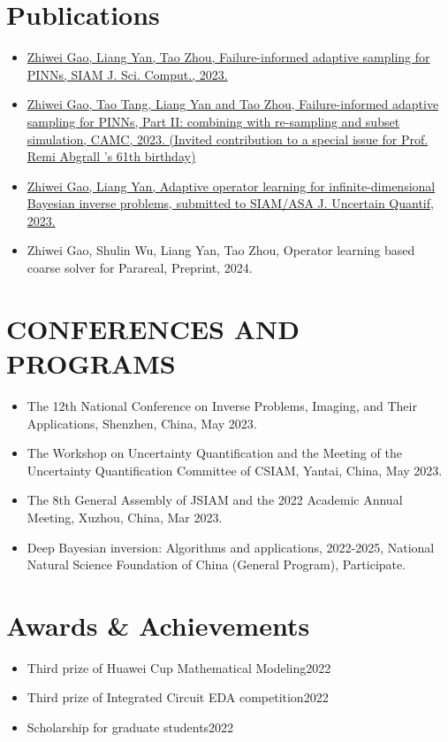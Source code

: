 \documentclass[letterpaper,11pt]{article}
\newcommand{\resumeItem}[1]{
  \item\small{
    {#1 \vspace{-2pt}}
  }
}
\newcommand{\resumeItemListStart}{\begin{itemize}}
\newcommand{\resumeItemListEnd}{\end{itemize}\vspace{-5pt}}
\begin{document}
\section{Publications}
    \vspace{3pt}
          \resumeItemListStart
            \resumeItem{\href{https://epubs.siam.org/doi/10.1137/22M1527763}{Zhiwei Gao, Liang Yan, Tao Zhou, Failure-informed adaptive sampling for PINNs, SIAM J. Sci. Comput., 2023.}}
            \resumeItem{ \href{https://link.springer.com/article/10.1007/s42967-023-00312-7}{Zhiwei Gao, Tao Tang, Liang Yan and Tao Zhou,  Failure-informed adaptive sampling for PINNs, Part II: combining with re-sampling and subset simulation, CAMC, 2023.  (Invited contribution to a special issue for Prof. Remi Abgrall 's 61th birthday)}}
            \resumeItem{\href{https://arxiv.org/abs/2310.17844}{Zhiwei Gao, Liang Yan, Adaptive operator learning for infinite-dimensional Bayesian inverse problems, submitted to SIAM/ASA J. Uncertain Quantif, 2023.}}
            \resumeItem{Zhiwei Gao, Shulin Wu, Liang Yan, Tao Zhou, Operator learning based coarse solver for Parareal, Preprint, 2024.}
          \resumeItemListEnd
      
\section{CONFERENCES AND PROGRAMS}
\vspace{3pt}
\resumeItemListStart
\resumeItem{The 12th National Conference on Inverse Problems, Imaging, and Their Applications, Shenzhen, China, May 2023.}
\resumeItem{The Workshop on Uncertainty Quantification and the Meeting of the Uncertainty Quantification Committee of CSIAM, Yantai, China, May 2023.}
\resumeItem{The 8th General Assembly of JSIAM and the 2022 Academic Annual Meeting, Xuzhou, China, Mar 2023.}
\resumeItem{Deep Bayesian inversion: Algorithms and applications, 2022-2025, National Natural Science Foundation of China (General Program), Participate.}
\resumeItemListEnd 

\section{Awards \& Achievements}
  \vspace{2pt}
  \begin{itemize}
    \item Third prize of Huawei Cup Mathematical Modeling\hfill 2022
    \item Third prize of Integrated Circuit EDA competition\hfill 2022
    \item Scholarship for graduate students\hfill 2022
  \end{itemize}
    
\end{document}
